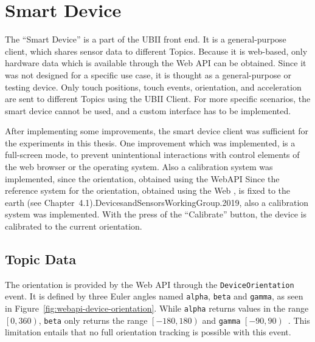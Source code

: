 \section{Smart Device}\label{section:smart-device}

The \enquote{Smart Device} is a part of the \gls{UBII} front end. It is a general-purpose client, which shares sensor data to different Topics. Because it is web-based, only hardware data which is available through the Web \gls{API} can be obtained. Since it was not designed for a specific use case, it is thought as a general-purpose or testing device. Only touch positions, touch events, orientation, and acceleration are sent to different Topics using the \gls{UBII} Client. For more specific scenarios, the smart device cannot be used, and a custom interface has to be implemented.

After implementing some improvements, the smart device client was sufficient for the experiments in this thesis. One improvement which was implemented, is a full-screen mode, to prevent unintentional interactions with control elements of the web browser or the operating system.
Also a calibration system was implemented, since the orientation, obtained using the Web\gls{API}
Since the reference system for the orientation, obtained using the Web , is fixed to the earth (see Chapter~4.1).{DevicesandSensorsWorkingGroup.2019}, also a calibration system was implemented. With the press of the \enquote{Calibrate} button, the device is calibrated to the current orientation. %


\subsection{Topic Data}\label{subsection:topic-data}

The orientation is provided by the Web \gls{API} through the \lstinline{DeviceOrientation} event. It is defined by three Euler angles named \lstinline{alpha}, \lstinline{beta} and \lstinline{gamma}, as seen in Figure~\ref{fig:webapi-device-orientation}.
While \lstinline{alpha} returns values in the range \(\left[0, 360\right)\), \lstinline{beta} only returns the range \(\left[-180, 180\right)\) and \lstinline{gamma} \(\left[-90, 90\right)\)~\cite[Chapter~4.1]{DevicesandSensorsWorkingGroup.2019}. %
This limitation entails that no full orientation tracking is possible with this event.

